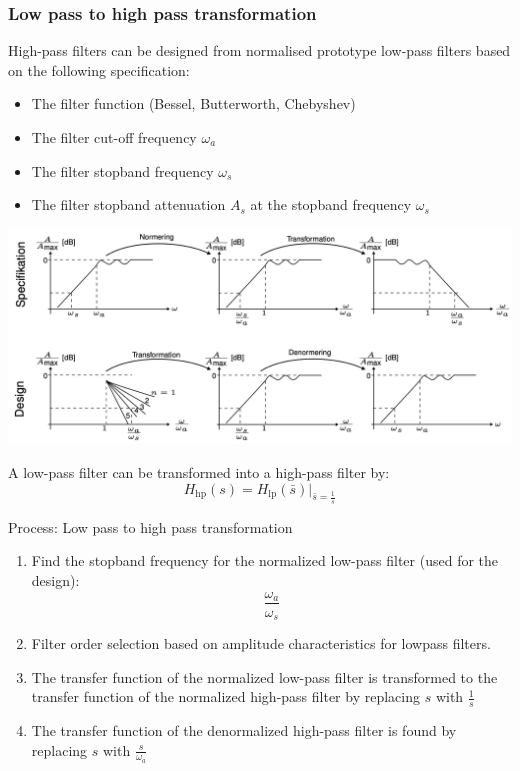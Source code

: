 \subsubsection{Low pass to high pass transformation}
High-pass filters can be designed from normalised prototype low-pass filters based on the following specification:
\begin{itemize}
  \item The filter function (Bessel, Butterworth, Chebyshev) 
  \item The filter cut-off frequency $\omega_{a}$
  \item The filter stopband frequency $\omega_{s}$
  \item The filter stopband attenuation $A_{s}$ at the stopband frequency $\omega_{s}$
\end{itemize}

\begin{center}
  \includegraphics[width=\textwidth]{Images/LP-to-HP.png} 
\end{center}
A low-pass filter can be transformed into a high-pass filter by:
$$H_{\text{hp}}(s)=H_{\text{lp}}(\bar{s})|_{\bar{s}=\frac{1}{s}}$$

Process: Low pass to high pass transformation
\begin{enumerate}
  \item Find the stopband frequency for the normalized low-pass filter (used for the design):$$\frac{\omega_{a}}{\omega_{s}}$$
  \item Filter order selection based on amplitude characteristics for lowpass filters.
  \item The transfer function of the normalized low-pass filter is transformed to the transfer function of the normalized high-pass filter by replacing $s$ with $\frac{1}{s}$
  \item The transfer function of the denormalized high-pass filter is found by replacing $s$ with $\frac{s}{\omega_{a}}$
\end{enumerate}


